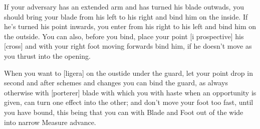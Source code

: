 \newpage


\newpage


If your adversary has an extended arm and has turned his blade
outwads, you should bring your blade from his left to his right and
bind him on the inside. If he's turned his point inwards, you
enter from his right to his left and bind him on the
outside. You can also, before you bind, place your point [i
prospective] his [cross] and with your right foot moving forwards
bind him, if he doesn't move as you thrust into the opening.

When you want to [ligera] on the oustide under the guard, let your
point drop in second and after schemes and changes you can bind
the guard, as always otherwise with [porterer] blade with which you
with haste when an opportunity is given, can turn one effect into the
other; and don't move your foot too fast, until you have bound,
this being that you can with Blade and Foot out of the wide into
narrow Measure advance.




